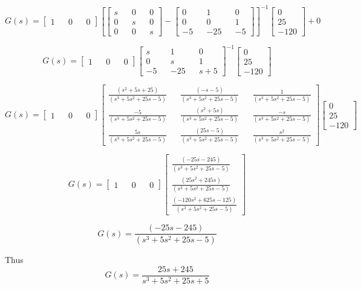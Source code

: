 \[
G(s) = 
\begin{bmatrix}
	1 &   & 0 &   & 0 
\end{bmatrix}
[
\begin{bmatrix}
	s &   & 0 &   & 0 \\
	0 &   & s &   & 0 \\
	0 &   & 0 &   & s 
\end{bmatrix}
-
\begin{bmatrix}
	0  &   & 1   &   & 0  \\
	0  &   & 0   &   & 1  \\
	-5 &   & -25 &   & -5 
\end{bmatrix}]^{-1}
\begin{bmatrix}
	0    \\
	25   \\
	-120 
\end{bmatrix} + 0
\]

\[
G(s) = 
\begin{bmatrix}
	1 &   & 0 &   & 0 
\end{bmatrix}
\begin{bmatrix}
	s  &   & 1   &   & 0   \\
	0  &   & s   &   & 1   \\
	-5 &   & -25 &   & s+5 
\end{bmatrix}^{-1}
\begin{bmatrix}
	0    \\
	25   \\
	-120 
\end{bmatrix}
\]

\[
G(s) = 
\begin{bmatrix}
	1 &   & 0 &   & 0 
\end{bmatrix}
\begin{bmatrix}
	\frac{(s^2+5s+25)}{(s^3+5s^2+25s-5)} &   & \frac{(-s-5)}{(s^3+5s^2+25s-5)}   &   & \frac{1}{(s^3+5s^2+25s-5)}   \\
	\frac{-5}{(s^3+5s^2+25s-5)}          &   & \frac{(s^2+5s)}{(s^3+5s^2+25s-5)} &   & \frac{-s}{(s^3+5s^2+25s-5)}  \\
	\frac{5s}{(s^3+5s^2+25s-5)}          &   & \frac{(25s-5)}{(s^3+5s^2+25s-5)}  &   & \frac{s^2}{(s^3+5s^2+25s-5)} 
\end{bmatrix}
\begin{bmatrix}
	0    \\
	25   \\
	-120 
\end{bmatrix}
\]

\[
G(s) = 
\begin{bmatrix}
	1 &   & 0 &   & 0 
\end{bmatrix}
\begin{bmatrix}
	\frac{(-25s-245)}{(s^3+5s^2+25s-5)}         \\
	\frac{(25s^2+245s)}{(s^3+5s^2+25s-5)}       \\
	\frac{(-120s^2+625s-125)}{(s^3+5s^2+25s-5)} 
\end{bmatrix}
\]

\[
G(s) = \frac{(-25s-245)}{(s^3+5s^2+25s-5)}
\]


Thus
\[
G(s) = \frac{25s + 245}{s^3 + 5s^2 + 25s + 5}
\]